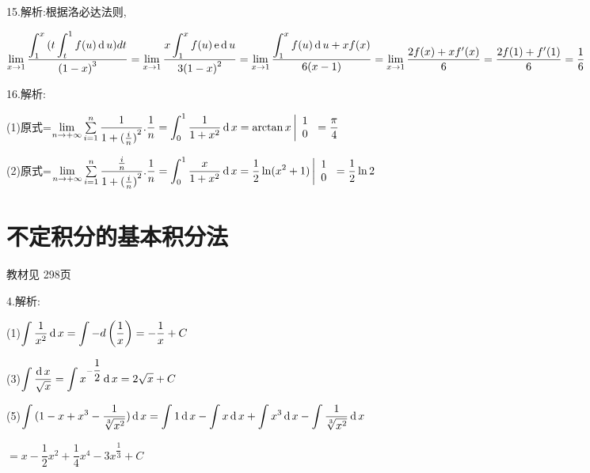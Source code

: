15.解析:根据洛必达法则,

$\lim\limits_{x \to 1} \dfrac{{\displaystyle\int_1^x {(t\displaystyle\int_t^1 {f(u)\operatorname{\mathop{}\!\mathrm{d}} u)dt} } }}{{{{(1 - x)}^3}}}
= \lim\limits_{x \to 1} \dfrac{{x\displaystyle\int_1^x {f(u)\operatorname{\operatorname{e}} \operatorname{\mathop{}\!\mathrm{d}} u} }}{{3{{(1 - x)}^2}}}
= \lim\limits_{x \to 1} \dfrac{{\displaystyle\int_1^x {f(u)\operatorname{\mathop{}\!\mathrm{d}} u}  + xf(x)}}{{6(x - 1)}}
= \lim\limits_{x \to 1} \dfrac{{2f(x) + xf'(x)}}{6}
= \dfrac{{2f(1) + f'(1)}}{6}
= \dfrac{1}{6}$

16.解析:

(1)原式=$\lim\limits_{n \to +\infty} \sum\limits_{i = 1}^n {\dfrac{1}{{1 + {{(\frac{i}{n})}^2}}}} .\dfrac{1}{n} = \displaystyle\int_0^1 {\dfrac{1}{{1 + {x^2}}}} \rd x = \arctan x\left| {\begin{array}{*{20}{c}}
  1 \\
  0
\end{array}} \right. = \dfrac{\pi }{4}$

(2)原式=$\lim\limits_{n \to +\infty} \sum\limits_{i = 1}^n {\dfrac{{\frac{i}{n}}}{{1 + {{(\frac{i}{n})}^2}}}} .\dfrac{1}{n} = \displaystyle\int_0^1 {\dfrac{x}{{1 + {x^2}}}} \rd x = \dfrac{1}{2}\ln ({x^2} + 1)\left| {\begin{array}{*{20}{c}}
  1 \\
  0
\end{array}} \right. = \dfrac{1}{2}\ln 2$



\section{不定积分的基本积分法}
\begin{flushright}
  \color{zhanqing!80}
   教材见 298页 %
\end{flushright}

4.解析:

(1)$\displaystyle\int {\dfrac{1}{{{x^2}}}\operatorname{\mathop{}\!\mathrm{d}}x}  = \displaystyle\int { - d\left( {\dfrac{1}{x}} \right)}  =  - \dfrac{1}{x} + C$

(3)$\displaystyle\int {\dfrac{{\operatorname{\mathop{}\!\mathrm{d}}x}}{{\sqrt x }}}  = \displaystyle\int {{x^{ - \dfrac{1}{2}}}} \operatorname{\mathop{}\!\mathrm{d}} x = 2\sqrt x  + C$

(5)$\displaystyle\int {(1 - x + {x^3} - \dfrac{1}{{\sqrt[3]{{{x^2}}}}}} )\operatorname{\mathop{}\!\mathrm{d}} x = \displaystyle\int {1\operatorname{\mathop{}\!\mathrm{d}}x}  - \displaystyle\int {x\operatorname{\mathop{}\!\mathrm{d}}x + \displaystyle\int {{x^3}\operatorname{\mathop{}\!\mathrm{d}}x - \displaystyle\int {\dfrac{1}{{\sqrt[3]{{{x^2}}}}}\operatorname{\mathop{}\!\mathrm{d}}x} } } $

$ = x - \dfrac{1}{2}{x^2} + \dfrac{1}{4}{x^4} - 3{x^{\dfrac{1}{3}}} + C$

